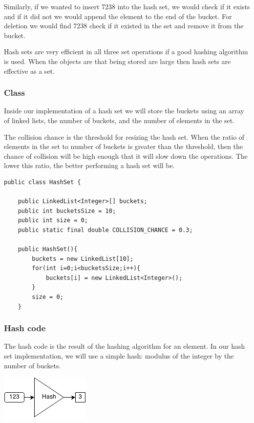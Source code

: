 \documentclass[11pt,oneside]{book}
\makeatletter
\def\maxwidth#1{\ifdim\Gin@nat@width>#1 #1\else\Gin@nat@width\fi}
\makeatother
\begin{document}
Similarly, if we wanted to insert 7238 into the hash set, we would check if it exists and if it did not we would append the element to the end of the bucket. For deletion we would find 7238 check if it existed in the set and remove it from the bucket.

Hash sets are very efficient in all three set operations if a good hashing algorithm is used. When the objects are that being stored are large then hash sets are effective as a set.

\subsubsection{Class}

Inside our implementation of a hash set we will store the buckets using an array of linked lists, the number of buckets, and the number of elements in the set.

The collision chance is the threshold for resizing the hash set. When the ratio of elements in the set to number of buckets is greater than the threshold, then the chance of collision will be high enough that it will slow down the operations. The lower this ratio, the better performing a hash set will be.

\begin{lstlisting}
public class HashSet {

    public LinkedList<Integer>[] buckets;
    public int bucketsSize = 10;
    public int size = 0;
    public static final double COLLISION_CHANCE = 0.3;
    
    public HashSet(){
        buckets = new LinkedList[10];
        for(int i=0;i<bucketsSize;i++){
            buckets[i] = new LinkedList<Integer>();
        }
        size = 0;
    }
\end{lstlisting}

\subsubsection{Hash code}

The hash code is the result of the hashing algorithm for an element. In our hash set implementation, we will use a simple hash: modulus of the integer by the number of buckets.

\includegraphics[width=\maxwidth{\textwidth}]{hashcode.png}
\end{document}
